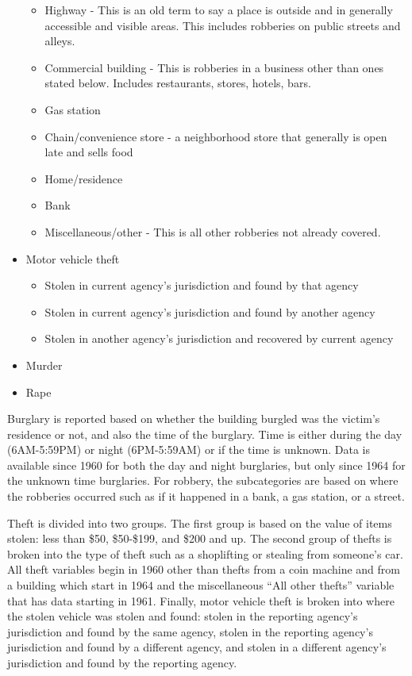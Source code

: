\documentclass[
]{krantz}
\providecommand{\tightlist}{%
  \setlength{\itemsep}{0pt}\setlength{\parskip}{0pt}}
\begin{document}
\begin{itemize}
  \begin{itemize}
  \tightlist
  \item
    Highway - This is an old term to say a place is outside
    and in generally accessible and visible areas. This
    includes robberies on public streets and alleys.
  \item
    Commercial building - This is robberies in a business
    other than ones stated below. Includes restaurants,
    stores, hotels, bars.
  \item
    Gas station
  \item
    Chain/convenience store - a neighborhood store that
    generally is open late and sells food
  \item
    Home/residence
  \item
    Bank
  \item
    Miscellaneous/other - This is all other robberies not
    already covered.
  \end{itemize}
\item
  Motor vehicle theft

  \begin{itemize}
  \tightlist
  \item
    Stolen in current agency's jurisdiction and found by
    that agency
  \item
    Stolen in current agency's jurisdiction and found by
    another agency
  \item
    Stolen in another agency's jurisdiction and recovered by
    current agency
  \end{itemize}
\item
  Murder
\item
  Rape
\end{itemize}

Burglary is reported based on whether the building burgled
was the victim's residence or not, and also the time of the
burglary. Time is either during the day (6AM-5:59PM) or
night (6PM-5:59AM) or if the time is unknown. Data is
available since 1960 for both the day and night burglaries,
but only since 1964 for the unknown time burglaries. For
robbery, the subcategories are based on where the robberies
occurred such as if it happened in a bank, a gas station, or
a street.

Theft is divided into two groups. The first group is based
on the value of items stolen: less than \$50, \$50-\$199,
and \$200 and up. The second group of thefts is broken into
the type of theft such as a shoplifting or stealing from
someone's car. All theft variables begin in 1960 other than
thefts from a coin machine and from a building which start
in 1964 and the miscellaneous ``All other thefts'' variable
that has data starting in 1961. Finally, motor vehicle theft
is broken into where the stolen vehicle was stolen and
found: stolen in the reporting agency's jurisdiction and
found by the same agency, stolen in the reporting agency's
jurisdiction and found by a different agency, and stolen in
a different agency's jurisdiction and found by the reporting
agency.
\end{document}
